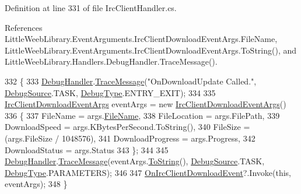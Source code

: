Definition at line 331 of file Irc\+Client\+Handler.\+cs.



References Little\+Weeb\+Library.\+Event\+Arguments.\+Irc\+Client\+Download\+Event\+Args.\+File\+Name, Little\+Weeb\+Library.\+Event\+Arguments.\+Irc\+Client\+Download\+Event\+Args.\+To\+String(), and Little\+Weeb\+Library.\+Handlers.\+Debug\+Handler.\+Trace\+Message().


\begin{DoxyCode}
332         \{
333             \mbox{\hyperlink{class_little_weeb_library_1_1_handlers_1_1_irc_client_handler_ab50ece494948d25db1839f4d6eab038f}{DebugHandler}}.\mbox{\hyperlink{interface_little_weeb_library_1_1_handlers_1_1_i_debug_handler_a2e405bc3492e683cd3702fae125221bc}{TraceMessage}}(\textcolor{stringliteral}{"OnDownloadUpdate Called."}, 
      \mbox{\hyperlink{namespace_little_weeb_library_1_1_handlers_a2a6ca0775121c9c503d58aa254d292be}{DebugSource}}.TASK, \mbox{\hyperlink{namespace_little_weeb_library_1_1_handlers_ab66019ed40462876ec4e61bb3ccb0a62}{DebugType}}.ENTRY\_EXIT);
334 
335             \mbox{\hyperlink{class_little_weeb_library_1_1_event_arguments_1_1_irc_client_download_event_args}{IrcClientDownloadEventArgs}} eventArgs = \textcolor{keyword}{new} 
      \mbox{\hyperlink{class_little_weeb_library_1_1_event_arguments_1_1_irc_client_download_event_args}{IrcClientDownloadEventArgs}}()
336             \{
337                 FileName = args.\mbox{\hyperlink{class_little_weeb_library_1_1_event_arguments_1_1_irc_client_download_event_args_ae708a4da9c599b02372c55dd08294cd5}{FileName}},
338                 FileLocation = args.FilePath,
339                 DownloadSpeed = args.KBytesPerSecond.ToString(),
340                 FileSize = (args.FileSize / 1048576),
341                 DownloadProgress = args.Progress,
342                 DownloadStatus = args.Status
343             \};
344 
345             \mbox{\hyperlink{class_little_weeb_library_1_1_handlers_1_1_irc_client_handler_ab50ece494948d25db1839f4d6eab038f}{DebugHandler}}.\mbox{\hyperlink{interface_little_weeb_library_1_1_handlers_1_1_i_debug_handler_a2e405bc3492e683cd3702fae125221bc}{TraceMessage}}(eventArgs.\mbox{\hyperlink{class_little_weeb_library_1_1_event_arguments_1_1_irc_client_download_event_args_a08055fe777a1585dafab7fbeec58b891}{ToString}}(), 
      \mbox{\hyperlink{namespace_little_weeb_library_1_1_handlers_a2a6ca0775121c9c503d58aa254d292be}{DebugSource}}.TASK, \mbox{\hyperlink{namespace_little_weeb_library_1_1_handlers_ab66019ed40462876ec4e61bb3ccb0a62}{DebugType}}.PARAMETERS);
346 
347             \mbox{\hyperlink{class_little_weeb_library_1_1_handlers_1_1_irc_client_handler_a43ee49f8e97d65bf318e5f663587d7a6}{OnIrcClientDownloadEvent}}?.Invoke(\textcolor{keyword}{this}, eventArgs);
348         \}
\end{DoxyCode}
